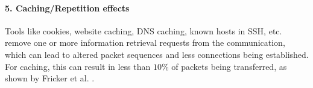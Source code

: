 \documentclass[runningheads]{llncs}
\begin{document}
\paragraph{5. Caching/Repetition effects}
Tools like cookies, website caching, DNS caching, known hosts in SSH, etc. remove one or more information retrieval requests from the communication, which can lead to altered packet sequences and less connections being established. For caching, this can result in less than $10\%$ of packets being transferred, as shown by Fricker et al. \cite{fricker2012impact}. 



\end{document}
